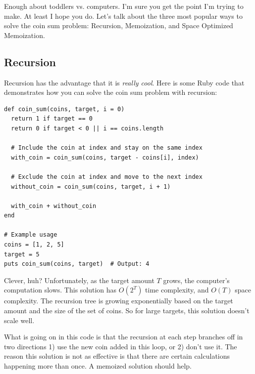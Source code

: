 Enough about toddlers vs. computers.  I'm sure you get the point I'm trying to make.  At least I hope you do.  Let's talk about the three most popular ways to solve the coin sum problem: Recursion, Memoization, and Space Optimized Memoization.

\subsection{Recursion}
Recursion has the advantage that it is \textit{really cool}.  Here is some Ruby code that demonstrates how you can solve the coin sum problem with recursion:
\begin{lstlisting}
def coin_sum(coins, target, i = 0)
  return 1 if target == 0
  return 0 if target < 0 || i == coins.length

  # Include the coin at index and stay on the same index
  with_coin = coin_sum(coins, target - coins[i], index)

  # Exclude the coin at index and move to the next index
  without_coin = coin_sum(coins, target, i + 1)

  with_coin + without_coin
end

# Example usage
coins = [1, 2, 5]
target = 5
puts coin_sum(coins, target)  # Output: 4
\end{lstlisting}

\noindent Clever, huh?  Unfortunately, as the target amount $T$ grows, the computer's computation slows.  This solution has $O(2^T)$ time complexity, and $O(T)$ space complexity.  The recursion tree is growing exponentially based on the target amount and the size of the set of coins.  So for large targets, this solution doesn't scale well.

What is going on in this code is that the recursion at each step branches off in two directions 1) use the new coin added in this loop, or 2) don't use it.  The reason this solution is not as effective is that there are certain calculations happening more than once.  A memoized solution should help.

